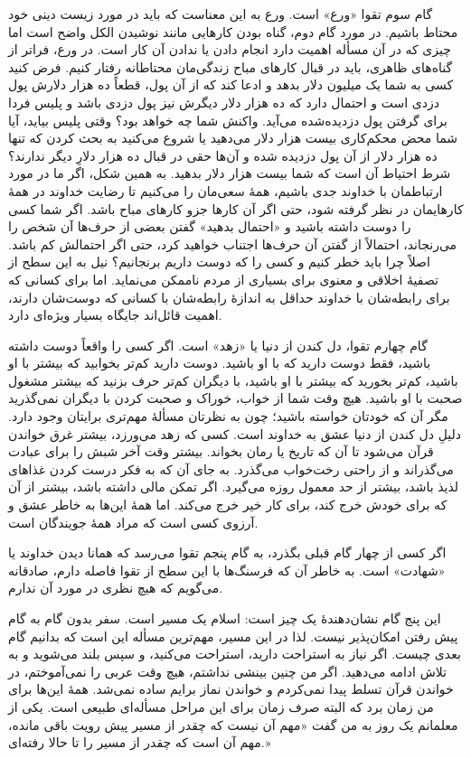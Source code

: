 گام سوم تقوا «ورع» است. ورع به این معناست که باید در مورد زیست دینی خود محتاط باشیم. در مورد گام دوم، گناه بودن کارهایی مانند نوشیدن الکل واضح است اما چیزی که در آن مسأله اهمیت دارد انجام دادن یا ندادن آن کار است. در ورع، فراتر از گناه‌های ظاهری، باید در قبال  کارهای مباح زندگی‌مان محتاطانه رفتار کنیم. فرض کنید کسی به شما یک میلیون دلار بدهد و ادعا کند که از آن پول، قطعاً ده هزار دلارش پول دزدی است و احتمال دارد که ده هزار دلار دیگرش نیز پول دزدی باشد و پلیس فردا برای گرفتن پول دزدیده‌شده می‌آید. واکنش شما چه خواهد بود؟ وقتی پلیس بیاید، آیا شما محض محکم‌کاری بیست هزار دلار می‌دهید یا شروع می‌کنید به بحث کردن که تنها ده هزار دلار از آن پول دزدیده شده و آن‌ها حقی در قبال ده هزار دلارِ دیگر ندارند؟ شرط احتیاط آن است که شما بیست هزار دلار بدهید. به همین شکل، اگر ما در مورد ارتباطمان با خداوند جدی باشیم، همهٔ سعی‌مان را می‌کنیم تا رضایت خداوند در همهٔ کارهایمان در نظر گرفته شود، حتی اگر آن کارها جزو کارهای مباح باشد. اگر شما کسی را دوست داشته باشید و «احتمال بدهید» گفتن بعضی از حرف‌ها آن شخص را می‌رنجاند، احتمالاً از گفتن آن حرف‌ها اجتناب خواهید کرد، حتی اگر احتمالش کم باشد. اصلاً چرا باید خطر کنیم و کسی را که دوست داریم برنجانیم؟  نیل به این سطح از تصفیهٔ اخلاقی و معنوی برای بسیاری از مردم ناممکن می‌نماید. اما برای کسانی که برای  رابطه‌شان با خداوند حداقل به اندازهٔ رابطه‌شان با کسانی که دوست‌شان دارند، اهمیت قائل‌اند جایگاه بسیار ویژه‌ای دارد.

گام چهارم تقوا، دل کندن از دنیا یا «زهد» است. اگر کسی را واقعاً دوست داشته باشید، فقط دوست دارید که با او باشید. دوست دارید کم‌تر بخوابید که بیشتر با او باشید، کم‌تر بخورید که بیشتر با او باشید، با دیگران کم‌تر حرف بزنید که بیشتر مشغول صحبت با او باشید. هیچ وقت شما از خواب، خوراک و صحبت کردن‌ با دیگران نمی‌گذرید مگر آن که خودتان خواسته باشید؛ چون به نظرتان مسألهٔ مهم‌تری برایتان وجود دارد. دلیلِ دل کندن از دنیا عشق به خداوند است. کسی که زهد می‌ورزد، بیشتر غرق خواندن قرآن می‌شود تا آن که تاریخ یا رمان بخواند. بیشتر وقت آخر شبش را برای عبادت می‌گذراند و از راحتی رخت‌خواب می‌گذرد. به جای آن که به فکر درست کردن غذاهای لذیذ باشد، بیشتر از حد معمول روزه می‌گیرد. اگر تمکن مالی داشته باشد، بیشتر از آن که برای خودش خرج کند، برای کار خیر خرج می‌کند. اما همهٔ این‌ها به خاطر عشق و آرزوی کسی است که مراد همهٔ جویندگان است.

اگر کسی از چهار گام قبلی بگذرد، به گام پنجم تقوا می‌رسد که همانا دیدن خداوند یا «شهادت» است. به خاطر آن که فرسنگ‌ها با این سطح از تقوا فاصله دارم، صادقانه می‌گویم که هیچ نظری در مورد آن ندارم. 

این پنج گام نشان‌دهندهٔ یک چیز است: اسلام یک مسیر است. سفر بدون گام به گام پیش رفتن امکان‌پذیر نیست. لذا در این مسیر، مهم‌ترین مسأله این است که  بدانیم گام بعدی چیست. اگر نیاز به استراحت دارید،‌ استراحت می‌کنید، و سپس بلند می‌شوید و به تلاش ادامه می‌دهید. اگر من چنین بینشی نداشتم، هیچ وقت عربی را نمی‌آموختم، در خواندن قرآن تسلط پیدا نمی‌کردم و خواندن نماز برایم ساده نمی‌شد. همهٔ این‌ها برای من زمان برد که البته صرف زمان برای این مراحل مسأله‌ای طبیعی است. یکی از معلمانم یک روز به من گفت «مهم آن نیست که چقدر از مسیر پیش رویت باقی مانده، مهم آن است که چقدر از مسیر را تا حالا رفته‌ای.»









